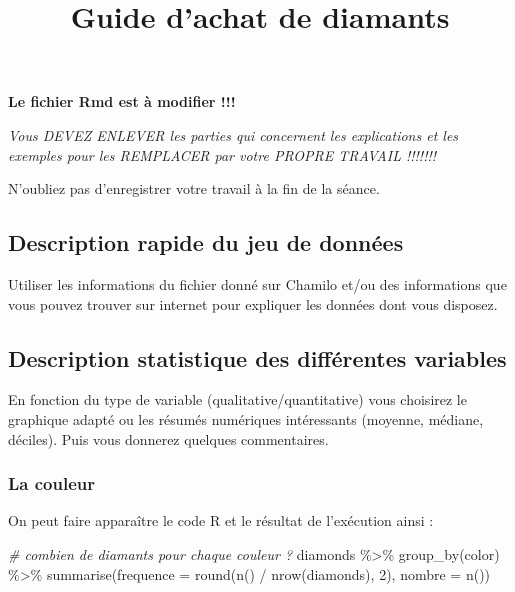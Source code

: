 \documentclass[
]{article}
\title{Guide d'achat de diamants}
\author{}
\date{\vspace{-2.5em}}
\newenvironment{Shaded}{\begin{snugshade}}{\end{snugshade}}
\newcommand{\AttributeTok}[1]{\textcolor[rgb]{0.77,0.63,0.00}{#1}}
\newcommand{\CommentTok}[1]{\textcolor[rgb]{0.56,0.35,0.01}{\textit{#1}}}
\newcommand{\DecValTok}[1]{\textcolor[rgb]{0.00,0.00,0.81}{#1}}
\newcommand{\FunctionTok}[1]{\textcolor[rgb]{0.00,0.00,0.00}{#1}}
\newcommand{\NormalTok}[1]{#1}
\newcommand{\SpecialCharTok}[1]{\textcolor[rgb]{0.00,0.00,0.00}{#1}}
\begin{document}
\maketitle

\textbf{Le fichier Rmd est à modifier !!!}

\emph{Vous DEVEZ ENLEVER les parties qui concernent les explications et
les exemples pour les REMPLACER par votre PROPRE TRAVAIL !!!!!!!}

N'oubliez pas d'enregistrer votre travail à la fin de la séance.

\hypertarget{description-rapide-du-jeu-de-donnuxe9es}{%
\subsection{Description rapide du jeu de
données}\label{description-rapide-du-jeu-de-donnuxe9es}}

Utiliser les informations du fichier donné sur Chamilo et/ou des
informations que vous pouvez trouver sur internet pour expliquer les
données dont vous disposez.

\hypertarget{description-statistique-des-diffuxe9rentes-variables}{%
\subsection{Description statistique des différentes
variables}\label{description-statistique-des-diffuxe9rentes-variables}}

En fonction du type de variable (qualitative/quantitative) vous
choisirez le graphique adapté ou les résumés numériques intéressants
(moyenne, médiane, déciles). Puis vous donnerez quelques commentaires.

\hypertarget{la-couleur}{%
\subsubsection{La couleur}\label{la-couleur}}

On peut faire apparaître le code R et le résultat de l'exécution ainsi :

\begin{Shaded}
\begin{Highlighting}[]
\CommentTok{\# combien de diamants pour chaque couleur ?}
\NormalTok{diamonds }\SpecialCharTok{\%\textgreater{}\%}
  \FunctionTok{group\_by}\NormalTok{(color) }\SpecialCharTok{\%\textgreater{}\%}
  \FunctionTok{summarise}\NormalTok{(}\AttributeTok{frequence =} \FunctionTok{round}\NormalTok{(}\FunctionTok{n}\NormalTok{() }\SpecialCharTok{/} \FunctionTok{nrow}\NormalTok{(diamonds), }\DecValTok{2}\NormalTok{), }\AttributeTok{nombre =} \FunctionTok{n}\NormalTok{())}
\end{Highlighting}
\end{Shaded}
\end{document}
